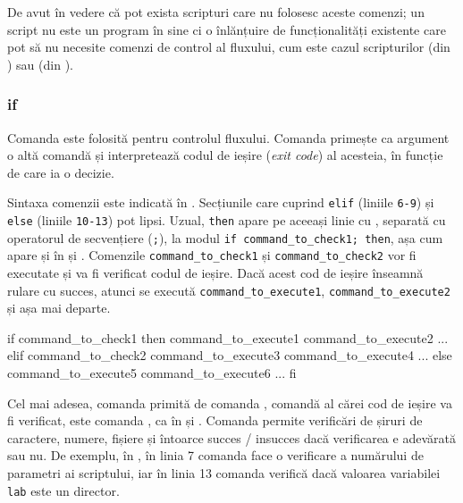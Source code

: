 De avut în vedere că pot exista scripturi care nu folosesc
aceste comenzi; un script nu este un program în sine ci o înlănțuire de
funcționalități existente care pot să nu necesite comenzi de control al
fluxului, cum este cazul scripturilor  (din ) sau  (din ).

\subsubsection{if}
\label{sec:auto:script-func:flow-control:if}

Comanda  este folosită pentru controlul fluxului.
Comanda primește ca argument o altă comandă și interpretează codul de ieșire (\textit{exit code}) al acesteia, în funcție de care ia o decizie.

Sintaxa comenzii  este indicată în .
Secțiunile care cuprind \texttt{elif} (liniile \texttt{6-9}) și \texttt{else} (liniile \texttt{10-13}) pot lipsi.
Uzual, \texttt{then} apare pe aceeași linie cu , separată cu operatorul de secvențiere (\texttt{;}), la modul \texttt{if command\_to\_check1; then}, așa cum apare și în  și .
Comenzile \texttt{command\_to\_check1} și \texttt{command\_to\_check2} vor fi executate și va fi verificat codul de ieșire.
Dacă acest cod de ieșire înseamnă rulare cu succes, atunci se execută \texttt{command\_to\_execute1}, \texttt{command\_to\_execute2} și așa mai departe.

\begin{screen}[caption={Sintaxa comenzii if},label={lst:auto:if-syntax}]
if command_to_check1
then
    command_to_execute1
    command_to_execute2
    ...
elif command_to_check2
    command_to_execute3
    command_to_execute4
    ...
else
    command_to_execute5
    command_to_execute6
    ...
fi
\end{screen}

Cel mai adesea, comanda primită de comanda , comandă al cărei cod de ieșire va fi verificat, este comanda , ca în  și .
Comanda  permite verificări de șiruri de caractere, numere, fișiere și întoarce succes / insucces dacă verificarea e adevărată sau nu.
De exemplu, în , în linia 7 comanda  face o verificare a numărului de parametri ai scriptului, iar în linia 13 comanda  verifică dacă valoarea variabilei \texttt{lab} este un director.

